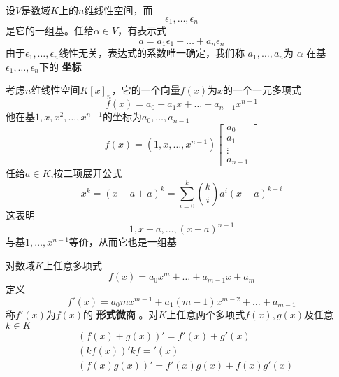 \documentclass[11pt]{article}
\begin{document}
设\(V\)是数域\(K\)上的\(n\)维线性空间，而
\begin{equation*}
\epsilon_1,\dots,\epsilon_n
\end{equation*}
是它的一组基。任给\(\alpha\in V\)，有表示式
\begin{equation*}
a=a_1\epsilon_1+\dots+a_n\epsilon_n
\end{equation*}
由于\(\epsilon_1,\dots,\epsilon_n\)线性无关，表达式的系数唯一确定，我们称
\(a_1,\dots,a_n\)为 \(\alpha\) 在基\(\epsilon_1,\dots,\epsilon_n\)下的 \textbf{坐标}

\begin{examplle}[]
考虑\(n\)维线性空间\(K[x]_n\)，它的一个向量\(f(x)\)为\(x\)的一个一元多项式
\begin{equation*}
f(x)=a_0+a_1x+\dots+a_{n-1}x^{n-1}
\end{equation*}
他在基\(1,x,x^2,\dots,x^{n-1}\)的坐标为\(a_0,\dots,a_{n-1}\)
\begin{equation*}
f(x)=(1,x,\dots,x^{n-1})
\begin{bmatrix}
a_0\\a_1\\\vdots\\a_{n-1}
\end{bmatrix}
\end{equation*}
任给\(a\in K\),按二项展开公式
\begin{equation*}
x^k=(x-a+a)^k=\sum_{i=0}^k\binom{k}{i}a^i(x-a)^{k-i}
\end{equation*}
这表明
\begin{equation*}
1,x-a,\dots,(x-a)^{n-1}
\end{equation*}
与基\(1,\dots,x^{n-1}\)等价，从而它也是一组基
\end{examplle}

对数域\(K\)上任意多项式
\begin{equation*}
f(x)=a_0x^m+\dots+a_{m-1}x+a_m
\end{equation*}
定义
\begin{equation*}
f'(x)=a_0mx^{m-1}+a_1(m-1)x^{m-2}+\dots+a_{m-1}
\end{equation*}
称\(f'(x)\)为\(f(x)\)的 \textbf{形式微商} 。对\(K\)上任意两个多项式\(f(x),g(x)\)及任意
\(k\in K\)
\begin{align*}
&(f(x)+g(x))'=f'(x)+g'(x)\\
&(kf(x))'kf='(x)\\
&(f(x)g(x))'=f'(x)g(x)+f(x)g'(x)
\end{align*}
\end{document}
